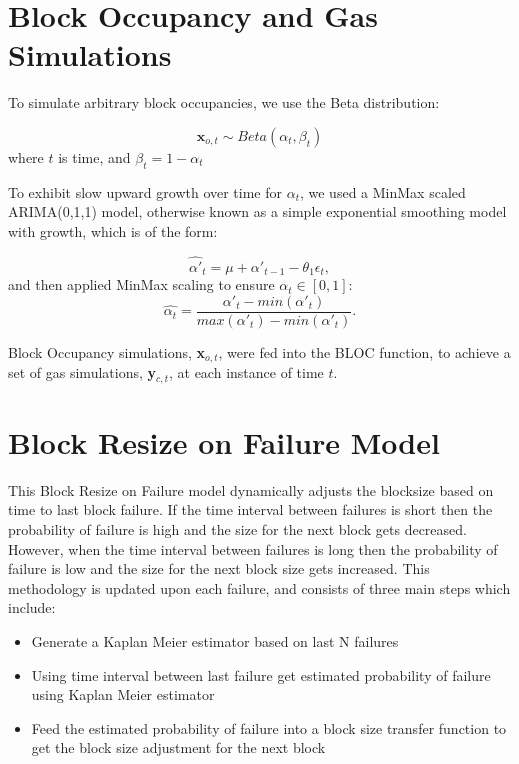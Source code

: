 \documentclass[peerreview]{ieeesyscoin}
\begin{document}
\section{Block Occupancy and Gas Simulations}

To simulate arbitrary block occupancies, we use the Beta distribution:

 \begin{equation}
\mathbf{x}_{o,t} \sim Beta(\alpha_{t},\beta_{t})
 \end{equation}
 where $t$ is time, and $\beta_{t} = 1-\alpha_{t}$
 
To exhibit slow upward growth over time for $\alpha_{t}$, we used a MinMax scaled ARIMA(0,1,1) model, otherwise known as a simple exponential smoothing model with growth, which is of the form:

\begin{equation}
\hat{\alpha'}_{t} = \mu + \alpha'_{t-1} - \theta_{1}\epsilon_{t},
\end{equation}
and then applied MinMax scaling to ensure $\alpha_{t} \in [0,1]$:
\begin{equation}
\hat{\alpha_{t}} = \dfrac{\alpha'_{t} - min(\alpha'_{t})}{  max(\alpha'_{t}) - min(\alpha'_{t}) }.
\end{equation}

Block Occupancy simulations, \textbf{x}$_{o,t}$, were fed into the BLOC function, to achieve a set of gas simulations, \textbf{y}$_{c,t}$, at each instance of time $t$.

\section{Block Resize on Failure Model}
\label{appendix:block_resize}

This Block Resize on Failure model dynamically adjusts the blocksize based on time to last block failure. If the time interval between failures is short then the probability of failure is high and the size for the next block gets decreased. However, when the time interval between failures is long then the probability of failure is low and the size for the next block size gets increased. This methodology is updated upon each failure, and consists of three main steps which include:
\begin{itemize}
\item Generate a Kaplan Meier estimator based on last N failures
\item Using time interval between last failure get estimated probability of failure using Kaplan Meier estimator
\item Feed the estimated probability of failure into a block size transfer function to get the block size adjustment for the next block
\end{itemize}
\end{document}
